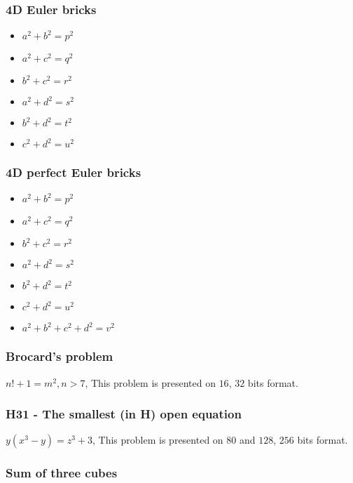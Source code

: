 \documentclass[conference]{IEEEtran}
\begin{document}
    \subsubsection{4D Euler bricks}

    \begin{itemize}
        \item $a^2 + b^2 = p^2$
        \item $a^2 + c^2 = q^2$
        \item $b^2 + c^2 = r^2$
        \item $a^2 + d^2 = s^2$
        \item $b^2 + d^2 = t^2$
        \item $c^2 + d^2 = u^2$
    \end{itemize}

    \subsubsection{4D perfect Euler bricks}

    \begin{itemize}
        \item $a^2 + b^2 = p^2$
        \item $a^2 + c^2 = q^2$
        \item $b^2 + c^2 = r^2$
        \item $a^2 + d^2 = s^2$
        \item $b^2 + d^2 = t^2$
        \item $c^2 + d^2 = u^2$
        \item $a^2 + b^2 + c^2 + d^2 = v^2$
    \end{itemize}

    \subsubsection{Brocard's problem}

    $n!+1 = m^2, n > 7$, This problem is presented on $16$, $32$ bits format.

    \subsubsection{H31 - The smallest (in H) open equation \cite{b2}}

    $y(x^3 - y) = z^3 + 3$, This problem is presented on $80$ and $128$, $256$ bits format.

    \subsubsection{Sum of three cubes}
\end{document}
